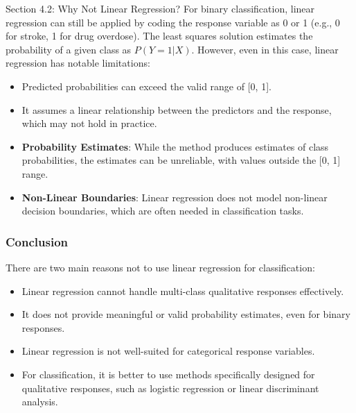 \begin{notes}{Section 4.2: Why Not Linear Regression?}
    For binary classification, linear regression can still be applied by coding the response variable as 0 or 1 (e.g., 0 for stroke, 1 for drug overdose). The least squares solution estimates the 
    probability of a given class as $P(Y = 1 | X)$. However, even in this case, linear regression has notable limitations:
    \begin{itemize}
        \item Predicted probabilities can exceed the valid range of [0, 1].
        \item It assumes a linear relationship between the predictors and the response, which may not hold in practice.
    \end{itemize}
    
    \begin{highlight}
        \begin{itemize}
            \item \textbf{Probability Estimates}: While the method produces estimates of class probabilities, the estimates can be unreliable, with values outside the [0, 1] range.
            \item \textbf{Non-Linear Boundaries}: Linear regression does not model non-linear decision boundaries, which are often needed in classification tasks.
        \end{itemize}
    \end{highlight}
    
    \subsubsection*{Conclusion}
    
    There are two main reasons not to use linear regression for classification:
    \begin{itemize}
        \item Linear regression cannot handle multi-class qualitative responses effectively.
        \item It does not provide meaningful or valid probability estimates, even for binary responses.
    \end{itemize}
    
    \begin{highlight}
        \begin{itemize}
            \item Linear regression is not well-suited for categorical response variables.
            \item For classification, it is better to use methods specifically designed for qualitative responses, such as logistic regression or linear discriminant analysis.
        \end{itemize}
    \end{highlight}
\end{notes}

